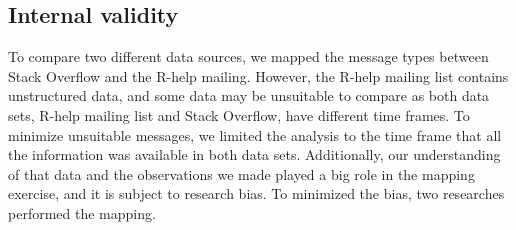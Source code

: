 \subsection{Internal validity}


To compare two different data sources, we mapped the message types between Stack Overflow and the R-help mailing.
However, the R-help mailing list contains unstructured data, and some data may be unsuitable to compare as both data sets, R-help mailing list and Stack Overflow, have different time frames.
To minimize unsuitable messages, we limited the analysis to the time frame that all the information was available in both data sets.
Additionally, our understanding of that data and the observations we made played a big role in the mapping exercise, and it is subject to research bias.
To minimized the bias, two researches performed the mapping.



